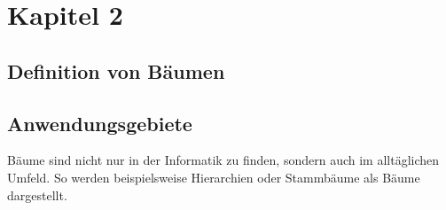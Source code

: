 \chapter{Kapitel 2}
\label{chap:kapitel2}

\section{Definition von Bäumen}

\section{Anwendungsgebiete}

Bäume sind nicht nur in der Informatik zu finden, sondern auch im alltäglichen Umfeld. 
So werden beispielsweise Hierarchien oder Stammbäume als Bäume dargestellt.
\cite[]{q1}

